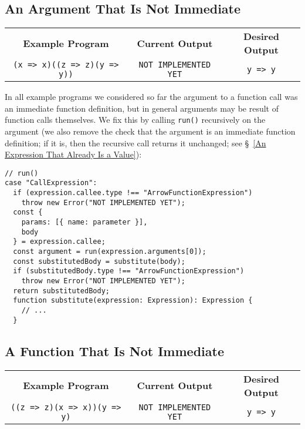 \documentclass[12pt, oneside]{book}
\begin{document}
\subsection{An Argument That Is Not Immediate}
\label{An Argument That Is Not Immediate}

\begin{center}
\begin{tabular}{c|c|c}
\textbf{Example Program} & \textbf{Current Output} & \textbf{Desired Output} \\
\texttt{(x => x)((z => z)(y => y))} & \texttt{NOT IMPLEMENTED YET} & \texttt{y => y} \\
\end{tabular}
\end{center}

\noindent In all example programs we considered so far the argument to a function call was an immediate function definition, but in general arguments may be result of function calls themselves. We fix this by calling \texttt{run()} recursively on the argument (we also remove the check that the argument is an immediate function definition; if it is, then the recursive call returns it unchanged; see §~\ref{An Expression That Already Is a Value}):

\begin{verbatim}
// run()
case "CallExpression":
  if (expression.callee.type !== "ArrowFunctionExpression")
    throw new Error("NOT IMPLEMENTED YET");
  const {
    params: [{ name: parameter }],
    body
  } = expression.callee;
  const argument = run(expression.arguments[0]);
  const substitutedBody = substitute(body);
  if (substitutedBody.type !== "ArrowFunctionExpression")
    throw new Error("NOT IMPLEMENTED YET");
  return substitutedBody;
  function substitute(expression: Expression): Expression {
    // ...
  }
\end{verbatim}

\subsection{A Function That Is Not Immediate}
\label{A Function That Is Not Immediate}

\begin{center}
\begin{tabular}{c|c|c}
\textbf{Example Program} & \textbf{Current Output} & \textbf{Desired Output} \\
\texttt{((z => z)(x => x))(y => y)} & \texttt{NOT IMPLEMENTED YET} & \texttt{y => y} \\
\end{tabular}
\end{center}
\end{document}
